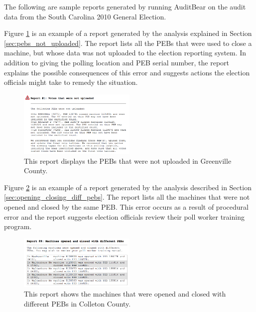 \smvertspace

The following are sample reports generated by running AuditBear on the
audit data from the South Carolina 2010 General Election. 

Figure
\ref{fig:sample2} is an example of a report generated by the analysis
explained in Section \ref{sec:pebs_not_uploaded}. The report lists all
the PEBs that were used to close a machine, but whose data was not
uploaded to the election reporting 
system. In addition to giving the polling location and PEB serial
number, the report explains the possible consequences of this
error and suggests actions the election officials might take to
remedy the situation.

\begin{figure}[h!]
  \caption{This report displays the PEBs that were not uploaded in Greenville County.}
  \label{fig:sample2}
  \centering
    \includegraphics[width=0.5\textwidth]{sample3}
\end{figure}

Figure \ref{fig:sample3} is an example of a report generated by the
analysis described in Section \ref{sec:opening_closing_diff_pebs}. The
report lists all the machines that were not opened and closed by the
same PEB. This error occurs as a result of procedural error and the
report suggests election officials review their poll worker training
program.

\begin{figure}[h!]
  \caption{This report shows the machines that were opened and closed with different PEBs in Colleton County.}
  \label{fig:sample3}
  \centering
    \includegraphics[width=0.5\textwidth]{sample2}
\end{figure}
